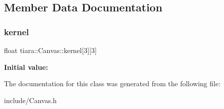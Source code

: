 \subsection{Member Data Documentation}
\mbox{\label{classtiara_1_1Canvas_a653b874f13d2b6ac18843ea53faa202e}} 
\subsubsection{\texorpdfstring{kernel}{kernel}}
{\footnotesize\ttfamily float tiara\+::\+Canvas\+::kernel\mbox{[}3\mbox{]}\mbox{[}3\mbox{]}\hspace{0.3cm}{\ttfamily [private]}}

{\bfseries Initial value\+:}
\begin{DoxyCode}{0}

\end{DoxyCode}


The documentation for this class was generated from the following file\+:\begin{DoxyCompactItemize}
\item 
include/Canvas.\+h\end{DoxyCompactItemize}
